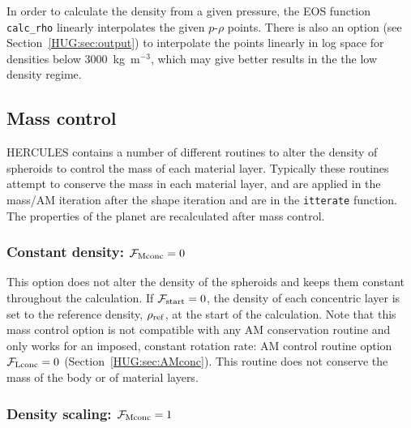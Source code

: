 \documentclass[11pt, oneside]{article}   	%
\begin{document}
In order to calculate the density from a given pressure, the EOS function \texttt{calc\_rho} linearly interpolates the given $p$-$\rho$ points.
There is also an option (see Section~\ref{HUG:sec:output}) to interpolate the points linearly in log space for densities below 3000~kg~m$^{-3}$, which may give better results in the the low density regime. 

\subsection{Mass control}
\label{HUG:sec:Mconc}

HERCULES contains a number of different routines to alter the density of spheroids to control the mass of each material layer.
Typically these routines attempt to conserve the mass in each material layer, and are applied in the mass/AM iteration after the shape iteration and are in the \texttt{itterate} function.
The properties of the planet are recalculated after mass control.

\subsubsection{Constant density: $\mathcal{F_{\rm Mconc}}=0$}

This option does not alter the density of the spheroids and keeps them constant throughout the calculation. 
If $\mathcal{F_{\rm start}}=0$, the density of each concentric layer is set to the reference density, $\rho_{\rm ref}$, at the start of the calculation.
Note that this mass control option is not compatible with any AM conservation routine and only works for an imposed, constant rotation rate: AM control routine option $\mathcal{F_{\rm Lconc}}=0$ (Section~\ref{HUG:sec:AMconc}).
This routine does not conserve the mass of the body or of material layers.

\subsubsection{Density scaling: $\mathcal{F_{\rm Mconc}}=1$}
\end{document}
